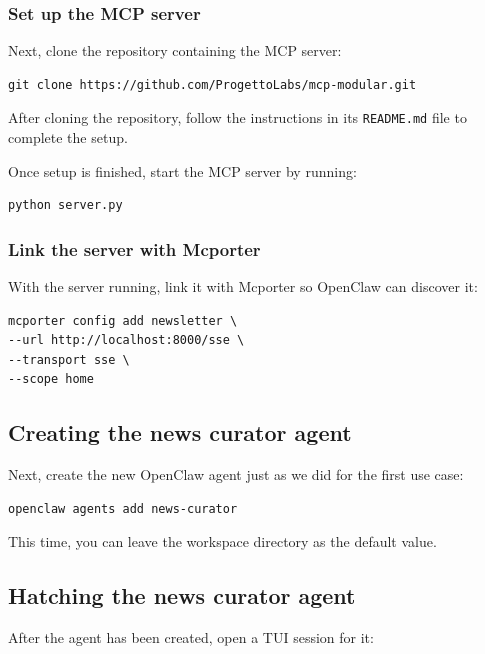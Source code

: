 \documentclass[12pt, a4paper]{article}
\begin{document}
\subsubsection{Set up the MCP server}

Next, clone the repository containing the MCP server:

\begin{lstlisting}[style=shellstyle]
git clone https://github.com/ProgettoLabs/mcp-modular.git
\end{lstlisting}

After cloning the repository, follow the instructions in its \texttt{README.md} file to complete the setup.

Once setup is finished, start the MCP server by running:

\begin{lstlisting}[style=shellstyle]
python server.py
\end{lstlisting}

\subsubsection{Link the server with Mcporter}

With the server running, link it with Mcporter so OpenClaw can discover it:

\begin{lstlisting}[style=shellstyle]
mcporter config add newsletter \
--url http://localhost:8000/sse \
--transport sse \
--scope home
\end{lstlisting}

\subsection{Creating the news curator agent}

Next, create the new OpenClaw agent just as we did for the first use case:

\begin{lstlisting}[style=shellstyle]
openclaw agents add news-curator
\end{lstlisting}

This time, you can leave the workspace directory as the default value.

\subsection{Hatching the news curator agent}

After the agent has been created, open a TUI session for it:
\end{document}
